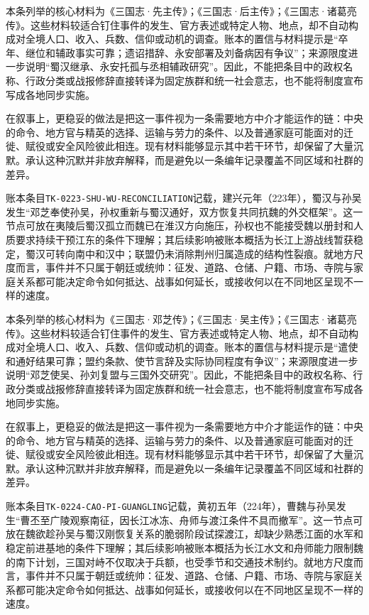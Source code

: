 本条列举的核心材料为《三国志·先主传》；《三国志·后主传》；《三国志·诸葛亮传》。这些材料较适合钉住事件的发生、官方表述或特定人物、地点，却不自动构成对全境人口、收入、兵数、信仰或动机的调查。账本的置信与材料提示是“卒年、继位和辅政事实可靠；遗诏措辞、永安部署及刘备病因有争议”；来源限度进一步说明“蜀汉继承、永安托孤与丞相辅政研究”。因此，不能把条目中的政权名称、行政分类或战报修辞直接转译为固定族群和统一社会意志，也不能将制度宣布写成各地同步实施。

在叙事上，更稳妥的做法是把这一事件视为一条需要地方中介才能运作的链：中央的命令、地方官与精英的选择、运输与劳力的条件、以及普通家庭可能面对的迁徙、赋役或安全风险彼此相连。现有材料能够显示其中若干环节，却保留了大量沉默。承认这种沉默并非放弃解释，而是避免以一条编年记录覆盖不同区域和社群的差异。

账本条目\texttt{TK-0223-SHU-WU-RECONCILIATION}记载，建兴元年（223年），蜀汉与孙吴发生“邓芝奉使孙吴，孙权重新与蜀汉通好，双方恢复共同抗魏的外交框架”。这一节点可放在夷陵后蜀汉孤立而魏已在淮汉方向施压，孙权也不能接受魏以册封和人质要求持续干预江东的条件下理解；其后续影响被账本概括为长江上游战线暂获稳定，蜀汉可转向南中和汉中；联盟仍未消除荆州归属造成的结构性裂痕。就地方尺度而言，事件并不只属于朝廷或统帅：征发、道路、仓储、户籍、市场、寺院与家庭关系都可能决定命令如何抵达、战事如何延长，或接收何以在不同地区呈现不一样的速度。

本条列举的核心材料为《三国志·邓芝传》；《三国志·吴主传》；《三国志·诸葛亮传》。这些材料较适合钉住事件的发生、官方表述或特定人物、地点，却不自动构成对全境人口、收入、兵数、信仰或动机的调查。账本的置信与材料提示是“遣使和通好结果可靠；盟约条款、使节言辞及实际协同程度有争议”；来源限度进一步说明“邓芝使吴、孙刘复盟与三国外交研究”。因此，不能把条目中的政权名称、行政分类或战报修辞直接转译为固定族群和统一社会意志，也不能将制度宣布写成各地同步实施。

在叙事上，更稳妥的做法是把这一事件视为一条需要地方中介才能运作的链：中央的命令、地方官与精英的选择、运输与劳力的条件、以及普通家庭可能面对的迁徙、赋役或安全风险彼此相连。现有材料能够显示其中若干环节，却保留了大量沉默。承认这种沉默并非放弃解释，而是避免以一条编年记录覆盖不同区域和社群的差异。

账本条目\texttt{TK-0224-CAO-PI-GUANGLING}记载，黄初五年（224年），曹魏与孙吴发生“曹丕至广陵观察南征，因长江冰冻、舟师与渡江条件不具而撤军”。这一节点可放在魏欲趁孙吴与蜀汉刚恢复关系的脆弱阶段试探渡江，却缺少熟悉江面的水军和稳定前进基地的条件下理解；其后续影响被账本概括为长江水文和舟师能力限制魏的南下计划，三国对峙不仅取决于兵额，也受季节和交通技术制约。就地方尺度而言，事件并不只属于朝廷或统帅：征发、道路、仓储、户籍、市场、寺院与家庭关系都可能决定命令如何抵达、战事如何延长，或接收何以在不同地区呈现不一样的速度。

